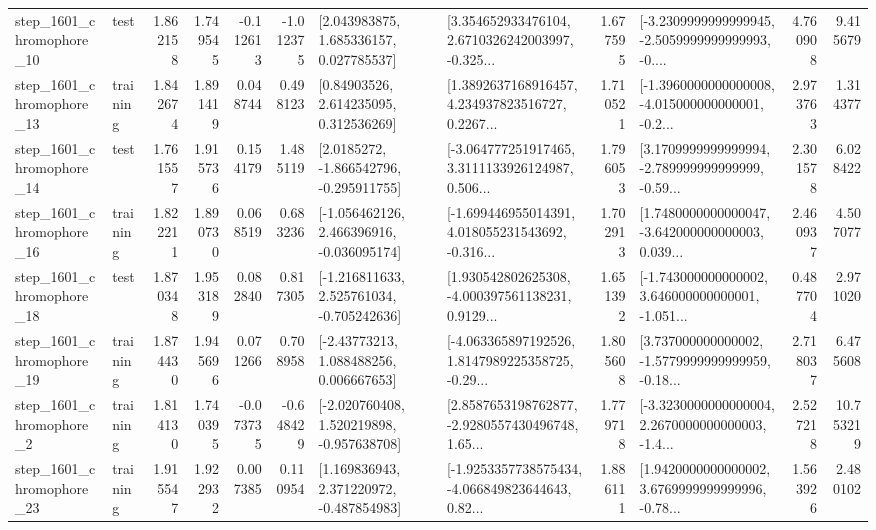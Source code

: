 \begin{tabular}{llrrrrllrlrr}
 step\_1601\_chromophore\_10 &      test &      1.862158 &    1.749545 &     -0.112613 & -1.012375 &     [2.043983875, 1.685336157, 0.027785537] &  [3.354652933476104, 2.6710326242003997, -0.325... &       1.677595 &  [-3.2309999999999945, -2.5059999999999993, -0.... &            4.760908 &          9.415679 \\
 step\_1601\_chromophore\_13 &  training &      1.842674 &    1.891419 &      0.048744 &  0.498123 &      [0.84903526, 2.614235095, 0.312536269] &  [1.3892637168916457, 4.234937823516727, 0.2267... &       1.710521 &  [-1.3960000000000008, -4.015000000000001, -0.2... &            2.973763 &          1.314377 \\
 step\_1601\_chromophore\_14 &      test &      1.761557 &    1.915736 &      0.154179 &  1.485119 &     [2.0185272, -1.866542796, -0.295911755] &  [-3.064777251917465, 3.3111133926124987, 0.506... &       1.796053 &  [3.1709999999999994, -2.789999999999999, -0.59... &            2.301578 &          6.028422 \\
 step\_1601\_chromophore\_16 &  training &      1.822211 &    1.890730 &      0.068519 &  0.683236 &   [-1.056462126, 2.466396916, -0.036095174] &  [-1.699446955014391, 4.018055231543692, -0.316... &       1.702913 &  [1.7480000000000047, -3.642000000000003, 0.039... &            2.460937 &          4.507077 \\
 step\_1601\_chromophore\_18 &      test &      1.870348 &    1.953189 &      0.082840 &  0.817305 &   [-1.216811633, 2.525761034, -0.705242636] &  [1.930542802625308, -4.000397561138231, 0.9129... &       1.651392 &  [-1.743000000000002, 3.646000000000001, -1.051... &            0.487704 &          2.971020 \\
 step\_1601\_chromophore\_19 &  training &      1.874430 &    1.945696 &      0.071266 &  0.708958 &     [-2.43773213, 1.088488256, 0.006667653] &  [-4.063365897192526, 1.8147989225358725, -0.29... &       1.805608 &  [3.737000000000002, -1.5779999999999959, -0.18... &            2.718037 &          6.475608 \\
  step\_1601\_chromophore\_2 &  training &      1.814130 &    1.740395 &     -0.073735 & -0.648429 &   [-2.020760408, 1.520219898, -0.957638708] &  [2.8587653198762877, -2.9280557430496748, 1.65... &       1.779718 &  [-3.3230000000000004, 2.2670000000000003, -1.4... &            2.527218 &         10.753219 \\
 step\_1601\_chromophore\_23 &  training &      1.915547 &    1.922932 &      0.007385 &  0.110954 &    [1.169836943, 2.371220972, -0.487854983] &  [-1.9253357738575434, -4.066849823644643, 0.82... &       1.886111 &  [1.9420000000000002, 3.6769999999999996, -0.78... &            1.563926 &          2.480102 \\

\end{tabular}
